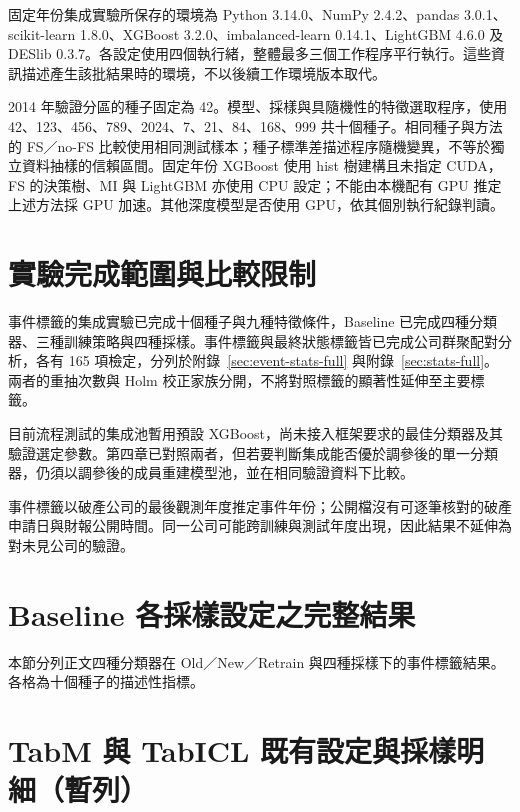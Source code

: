 

固定年份集成實驗所保存的環境為 Python 3.14.0、NumPy 2.4.2、pandas 3.0.1、scikit-learn 1.8.0、XGBoost 3.2.0、imbalanced-learn 0.14.1、LightGBM 4.6.0 及 DESlib 0.3.7。各設定使用四個執行緒，整體最多三個工作程序平行執行。這些資訊描述產生該批結果時的環境，不以後續工作環境版本取代。

2014 年驗證分區的種子固定為 42。模型、採樣與具隨機性的特徵選取程序，使用 42、123、456、789、2024、7、21、84、168、999 共十個種子。相同種子與方法的 FS／no-FS 比較使用相同測試樣本；種子標準差描述程序隨機變異，不等於獨立資料抽樣的信賴區間。固定年份 XGBoost 使用 hist 樹建構且未指定 CUDA，FS 的決策樹、MI 與 LightGBM 亦使用 CPU 設定；不能由本機配有 GPU 推定上述方法採 GPU 加速。其他深度模型是否使用 GPU，依其個別執行紀錄判讀。

\section{實驗完成範圍與比較限制}\label{sec:method-evidence}

事件標籤的集成實驗已完成十個種子與九種特徵條件，Baseline 已完成四種分類器、三種訓練策略與四種採樣。事件標籤與最終狀態標籤皆已完成公司群聚配對分析，各有 165 項檢定，分列於附錄~\ref{sec:event-stats-full} 與附錄~\ref{sec:stats-full}。兩者的重抽次數與 Holm 校正家族分開，不將對照標籤的顯著性延伸至主要標籤。

目前流程測試的集成池暫用預設 XGBoost，尚未接入框架要求的最佳分類器及其驗證選定參數。第四章已對照兩者，但若要判斷集成能否優於調參後的單一分類器，仍須以調參後的成員重建模型池，並在相同驗證資料下比較。

事件標籤以破產公司的最後觀測年度推定事件年份；公開檔沒有可逐筆核對的破產申請日與財報公開時間。同一公司可能跨訓練與測試年度出現，因此結果不延伸為對未見公司的驗證。

\clearpage
\section{Baseline 各採樣設定之完整結果}\label{sec:results-baseline-full}

本節分列正文四種分類器在 Old／New／Retrain 與四種採樣下的事件標籤結果。各格為十個種子的描述性指標。



\clearpage
\section{TabM 與 TabICL 既有設定與採樣明細（暫列）}\label{sec:deep-reference-details}

